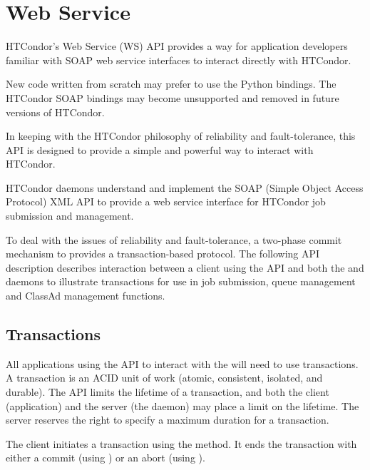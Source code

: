 \section{ Web Service}\label{API-WebService}

HTCondor's Web Service (WS) API provides a way for application developers
familiar with SOAP web service interfaces to interact directly with HTCondor.

New code written from scratch may prefer to use the Python bindings.  The
HTCondor SOAP bindings may become unsupported and removed in future versions
of HTCondor.

In keeping with the HTCondor philosophy of reliability and fault-tolerance,
this API is designed to provide a simple and powerful way
to interact with HTCondor.

HTCondor daemons understand and implement
the SOAP (Simple Object Access Protocol) XML API
to provide a web service interface for HTCondor job submission
and management.

To deal with the issues of reliability and fault-tolerance,
a two-phase commit mechanism to provides a transaction-based protocol.  
The following API description describes interaction
between a client using the API and both the  and 
 daemons to illustrate transactions
for use in job submission, queue management and ClassAd 
management functions.

\subsection{\label{WebService-Transactions} Transactions}

All applications using the API to interact with the 
will need to use transactions.
A transaction is
an ACID unit of work (atomic, consistent, isolated, and durable).
The API limits the lifetime of a transaction,
and both the client (application) and the server
(the  daemon)
may place a limit on the lifetime.
The server reserves the right to specify a maximum
duration for a transaction. 


The client initiates a transaction using the
 method. 
It ends the transaction with either 
a commit (using )
or an abort (using ).

